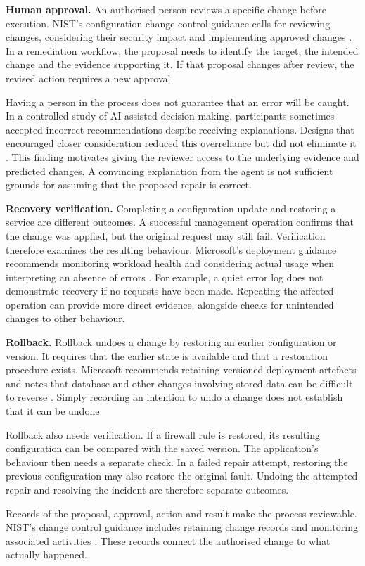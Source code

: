 \noindent\textbf{Human approval.} An authorised person reviews a specific
change before execution. NIST's configuration change control guidance
calls for reviewing changes, considering their security impact and
implementing approved changes \parencite[CM-3]{nist2020securitycontrols}.
In a remediation workflow, the proposal needs to identify the target,
the intended change and the evidence supporting it. If that proposal
changes after review, the revised action requires a new approval.

Having a person in the process does not guarantee that an error will be
caught. In a controlled study of AI-assisted decision-making, participants
sometimes accepted incorrect recommendations despite receiving
explanations. Designs that encouraged closer consideration reduced this
overreliance but did not eliminate it \parencite{bucinca2021trust}.
This finding motivates giving the reviewer access to the underlying
evidence and predicted changes. A convincing explanation from the agent
is not sufficient grounds for assuming that the proposed repair is
correct.

\noindent\textbf{Recovery verification.} Completing a configuration update
and restoring a service are different outcomes. A successful management
operation confirms that the change was applied, but the original request
may still fail. Verification therefore examines the resulting behaviour.
Microsoft's deployment guidance recommends monitoring workload health
and considering actual usage when interpreting an absence of errors
\parencite{microsoft2026safedeployments}. For example, a quiet error log
does not demonstrate recovery if no requests have been made. Repeating
the affected operation can provide more direct evidence, alongside checks
for unintended changes to other behaviour.

\noindent\textbf{Rollback.} Rollback undoes a change by restoring an earlier
configuration or version. It requires that the earlier state is available
and that a restoration procedure exists. Microsoft recommends retaining
versioned deployment artefacts and notes that database and other changes
involving stored data can be difficult to reverse
\parencite{microsoft2026safedeployments}. Simply recording an intention to
undo a change does not establish that it can be undone.

Rollback also needs verification. If a firewall rule is restored, its
resulting configuration can be compared with the saved version. The
application's behaviour then needs a separate check. In a failed repair
attempt, restoring the previous configuration may also restore the
original fault. Undoing the attempted repair and resolving the incident
are therefore separate outcomes.

Records of the proposal, approval, action and result make the process
reviewable. NIST's change control guidance includes retaining change
records and monitoring associated activities
\parencite[CM-3]{nist2020securitycontrols}. These records connect the
authorised change to what actually happened.

